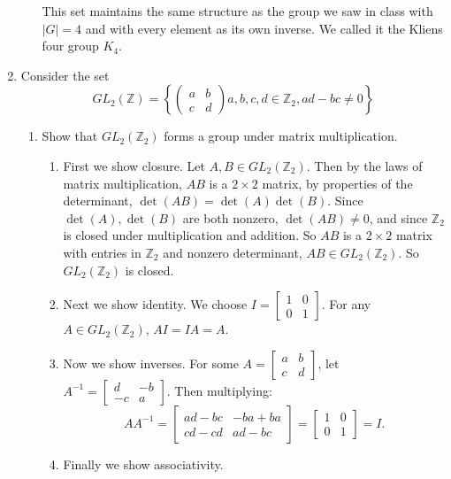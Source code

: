 \documentclass{article}
\begin{document}
\begin{enumerate}
\begin{enumerate}[label= (\alph*)]
This set maintains the same structure as the group we saw in class with $|G|=4$ and with every element as its own inverse. We called it the Kliens four group $K_4$.
\end{enumerate}

\item Consider the set
    $$GL_2(\mathbb{Z})=\left\{ \begin{pmatrix} a&b\\c&d \end{pmatrix} 
    a,b,c,d\in \mathbb{Z}_2, ad-bc\neq 0 \right\} $$
    \begin{enumerate}[label= (\alph*)] 
        \item Show that $GL_2(\mathbb{Z}_2)$ forms a group under matrix multiplication.
            \begin{enumerate}[label=(\roman*)]
                \item First we show closure. Let $A,B\in GL_2(\mathbb{Z}_2)$. Then by the laws of 
                matrix multiplication, $AB$ is a $2\times 2$ matrix, by properties of the
                determinant, $\det(AB)=\det(A)\det(B)$. Since $\det(A),\det(B)$ are both
                nonzero, $\det(AB)\neq 0$, and since $\mathbb{Z}_2$ is closed under multiplication and addition. So $AB$ is a $2\times 2$ matrix with entries in 
                $\mathbb{Z}_2$ and nonzero determinant, $AB\in GL_{2}(\mathbb{Z}_2)$.
                So $GL_2(\mathbb{Z}_2)$ is closed.

                \item Next we show identity. We choose $I=\begin{bmatrix} 1&0\\0&1 \end{bmatrix} $. 
                For any $A\in GL_2(\mathbb{Z}_2)$, $AI=IA=A$.

                \item Now we show inverses. For some $A=\begin{bmatrix} a&b\\c&d \end{bmatrix}$, let 
                    $A^{-1}=\begin{bmatrix} d&-b\\-c&a \end{bmatrix}$. Then multiplying:
                    \[
                        AA^{-1}=\begin{bmatrix} ad-bc&-ba+ba\\cd-cd&ad-bc \end{bmatrix} 
                        =\begin{bmatrix} 1&0\\0&1 \end{bmatrix} =I
                    .\] 
                \item Finally we show associativity.


\end{enumerate}
\end{enumerate}
\end{enumerate}
\end{document}

